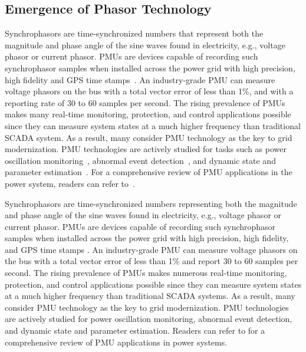 \subsection{Emergence of Phasor Technology}
Synchrophasors are time-synchronized numbers that represent both the magnitude and phase angle of the sine waves found in electricity, e.g., voltage phasor or current phasor. PMUs are devices capable of recording such synchrophasor samples when installed across the power grid with high precision, high fidelity and GPS time stamps~\cite{Aminifar2014}. An industry-grade PMU can measure voltage phasors on the bus with a total vector error of less than 1\%, and with a reporting rate of 30 to 60 samples per second. The rising prevalence of PMUs makes many real-time monitoring, protection, and control applications possible since they can measure system states at a much higher frequency than traditional SCADA system. As a result, many consider PMU technology as the key to grid modernization. PMU technologies are actively studied for tasks such as power oscillation monitoring~\cite{Abdi-Khorsand2017}, abnormal event detection~\cite{Mohamed2018,Kim2018}, and dynamic state and parameter estimation~\cite{Chakrabortty2009,Chavan2017}. For a comprehensive review of PMU applications in the power system, readers can refer to~\cite{Aminifar2014}. 

Synchrophasors are time-synchronized numbers representing both the magnitude and phase angle of the sine waves found in electricity, e.g., voltage phasor or current phasor. PMUs are devices capable of recording such synchrophasor samples when installed across the power grid with high precision, high fidelity, and GPS time stamps \cite{Aminifar2014}. An industry-grade PMU can measure voltage phasors on the bus with a total vector error of less than 1\% and report 30 to 60 samples per second. The rising prevalence of PMUs makes numerous real-time monitoring, protection, and control applications possible since they can measure system states at a much higher frequency than traditional SCADA systems. As a result, many consider PMU technology as the key to grid modernization. PMU technologies are actively studied for power oscillation monitoring, abnormal event detection, and dynamic state and parameter estimation. Readers can refer to \cite{Aminifar2014} for a comprehensive review of PMU applications in power systems.


